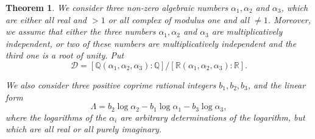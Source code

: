 \documentclass{amsart}
\newtheorem{theorem}{Theorem}
\theoremstyle{definition}
\def\QQ{\mathbb Q}
\def\RR{\mathbb R}
\begin{document}
\begin{theorem}\label{thm:kit}
We consider three non-zero algebraic numbers $\alpha_1, \alpha_2$ and $\alpha_3$, which are either all real and $> 1$ or all
complex of modulus one and all $\neq 1$. Moreover, we assume that either the three numbers $\alpha_1, \alpha_2$ and $\alpha_3$
are multiplicatively independent, or two of these numbers are multiplicatively independent and the third one is a root of unity. Put
$$
\mathcal{D} = [\QQ(\alpha_1, \alpha_2,\alpha_3): \QQ]/[\RR(\alpha_1, \alpha_2,\alpha_3): \RR].
$$

We also consider three positive coprime rational integers $b_1, b_2, b_3$, and the linear form
$$
\Lambda=b_2\log\alpha_2 - b_1\log\alpha_1  - b_3\log\alpha_3,
$$
where the logarithms of the $\alpha_i$ are arbitrary determinations of the logarithm, but which are all real or all purely imaginary.


\end{theorem}
\end{document}
